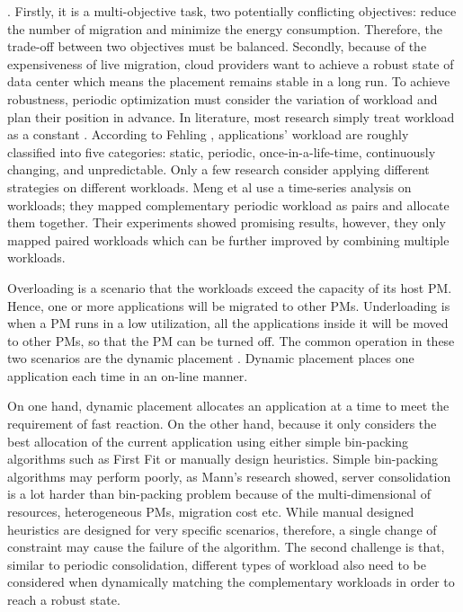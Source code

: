 . Firstly, it is a multi-objective task, two potentially conflicting objectives: reduce the number of migration and minimize the energy consumption. Therefore, the trade-off between two objectives must be balanced. Secondly, because of the expensiveness of live migration, cloud providers want to achieve a robust state of data center which means the placement remains stable in a long run. To achieve robustness, periodic optimization must consider the variation of workload and plan their position in advance. In literature, most research simply treat workload as a constant \cite{Viswanathan:2012ej, Chen:2011fl,Feller:2011vs}. According to Fehling \cite{Fehling:2014tl}, applications' workload are roughly classified into five categories: static, periodic, once-in-a-life-time, continuously changing, and unpredictable. Only a few research consider applying different strategies on different workloads. Meng et al \cite{Meng:2010gh} use a time-series analysis on workloads; they mapped complementary periodic workload as pairs and allocate them together. Their experiments showed promising results, however, they only mapped paired workloads which can be further improved by combining multiple workloads.
\vspace{5mm}


Overloading is a scenario that the workloads exceed the capacity of its host PM. Hence, one or more applications will be migrated to other PMs. Underloading is when a PM runs in a low utilization, all the applications inside it will be moved to other PMs, so that the PM can be turned off. The common operation in these two scenarios are the dynamic placement \cite{Xiao:2015ik}. Dynamic placement places one application each time in an on-line manner. 

 On one hand, dynamic placement allocates an application at a time to meet the requirement of fast reaction. On the other hand, because it only considers the best allocation of the current application using either simple bin-packing algorithms such as First Fit or manually design heuristics. Simple bin-packing algorithms may perform poorly, as Mann's research \cite{Mann:2015ua} showed, server consolidation is a lot harder than bin-packing problem because of the multi-dimensional of resources, heterogeneous PMs, migration cost etc. While manual designed heuristics are designed for very specific scenarios, therefore, a single change of constraint may cause the failure of the algorithm. The second challenge is that, similar to periodic consolidation, different types of workload also need to be considered when dynamically matching the complementary workloads in order to reach a robust state.

